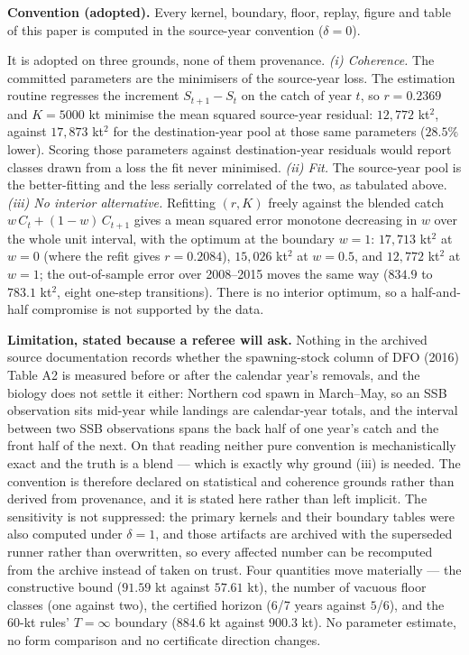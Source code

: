 \textbf{Convention (adopted).} Every kernel, boundary, floor, replay,
figure and table of this paper is computed in the source-year convention
(\(\delta = 0\)).

It is adopted on three grounds, none of them provenance. \emph{(i)
Coherence.} The committed parameters are the minimisers of the
source-year loss. The estimation routine regresses the increment
\(S_{t+1} - S_t\) on the catch of year \(t\), so \(r = 0.2369\) and
\(K = 5000\) kt minimise the mean squared source-year residual:
\(12{,}772\) kt\(^2\), against \(17{,}873\) kt\(^2\) for the
destination-year pool at those same parameters (\(28.5\%\) lower).
Scoring those parameters against destination-year residuals would report
classes drawn from a loss the fit never minimised. \emph{(ii) Fit.} The
source-year pool is the better-fitting and the less serially correlated
of the two, as tabulated above. \emph{(iii) No interior alternative.}
Refitting \((r, K)\) freely against the blended catch
\(w\,C_t + (1-w)\,C_{t+1}\) gives a mean squared error monotone
decreasing in \(w\) over the whole unit interval, with the optimum at the
boundary \(w = 1\): \(17{,}713\) kt\(^2\) at \(w = 0\) (where the refit
gives \(r = 0.2084\)), \(15{,}026\) kt\(^2\) at \(w = 0.5\), and
\(12{,}772\) kt\(^2\) at \(w = 1\); the out-of-sample error over
2008--2015 moves the same way (\(834.9\) to \(783.1\) kt\(^2\), eight
one-step transitions). There is no interior optimum, so a half-and-half
compromise is not supported by the data.

\textbf{Limitation, stated because a referee will ask.} Nothing in the
archived source documentation records whether the spawning-stock column of
DFO (2016) Table A2 is measured before or after the calendar year's
removals, and the biology does not settle it either: Northern cod spawn in
March--May, so an SSB observation sits mid-year while landings are
calendar-year totals, and the interval between two SSB observations spans
the back half of one year's catch and the front half of the next. On that
reading neither pure convention is mechanistically exact and the truth is
a blend --- which is exactly why ground (iii) is needed. The convention is
therefore declared on statistical and coherence grounds rather than
derived from provenance, and it is stated here rather than left implicit.
The sensitivity is not suppressed: the primary kernels and their boundary
tables were also computed under \(\delta = 1\), and those artifacts are
archived with the superseded runner rather than overwritten, so every
affected number can be recomputed from the archive instead of taken on
trust. Four quantities move materially ---
the constructive bound (\(91.59\) kt against \(57.61\) kt), the number of
vacuous floor classes (one against two), the certified horizon (\(6\)/7
years against \(5\)/6), and the 60-kt rules' \(T=\infty\) boundary
(\(884.6\) kt against \(900.3\) kt). No parameter estimate, no form
comparison and no certificate direction changes.


